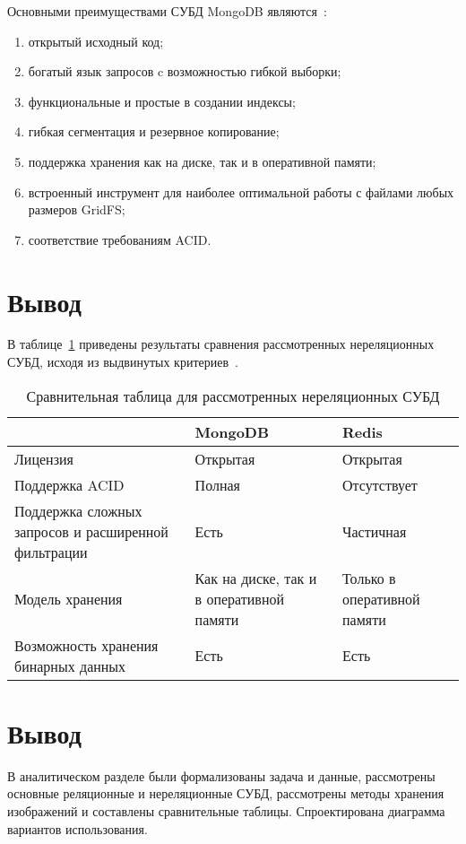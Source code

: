 Основными преимуществами СУБД MongoDB являются~\cite{cmpNosql1}:
\begin{enumerate}
	\item открытый исходный код;
	\item богатый язык запросов c возможностью гибкой выборки;
	\item функциональные и простые в создании индексы;
	\item гибкая сегментация и резервное копирование;
	\item поддержка хранения как на диске, так и в оперативной памяти;
	\item встроенный инструмент для наиболее оптимальной работы с файлами любых размеров GridFS;
	\item соответствие требованиям ACID.
\end{enumerate}

\section*{Вывод}

В таблице~\ref{table:compareNoSQLDBs} приведены результаты сравнения рассмотренных нереляционных СУБД, исходя из выдвинутых критериев~\cite{cmpNosql1}.
\begin{table}[h!]
	\begin{center}
		\caption{\label{table:compareNoSQLDBs} Сравнительная таблица для рассмотренных нереляционных СУБД}
		\begin{tabularx}{\textwidth}{|X|X|X|}
			\hline
			~ & MongoDB & Redis \\ \hline
			Лицензия & Открытая & Открытая \\ \hline
			Поддержка ACID & Полная & Отсутствует \\ \hline
			Поддержка сложных запросов и расширенной фильтрации & Есть & Частичная \\ \hline
			Модель хранения & Как на диске, так и в оперативной памяти & Только в оперативной памяти \\ \hline
			Возможность хранения бинарных данных & Есть & Есть \\ \hline
		\end{tabularx}
	\end{center}
\end{table}

\section{Вывод}

В аналитическом разделе были формализованы задача и данные, рассмотрены основные реляционные и нереляционные СУБД, рассмотрены методы хранения изображений и составлены сравнительные таблицы.
Спроектирована диаграмма вариантов использования.